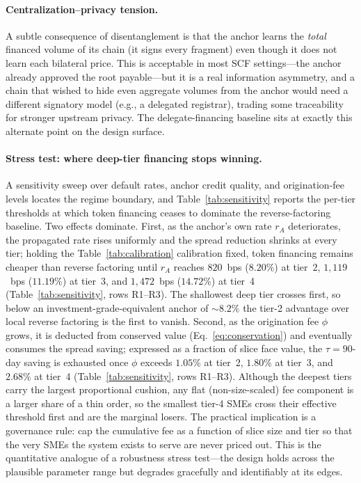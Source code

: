 \documentclass[10pt,twocolumn,letterpaper]{article}
\begin{document}
\paragraph{Centralization--privacy tension.} A subtle consequence of disentanglement
is that the anchor learns the \emph{total} financed volume of its chain (it signs every
fragment) even though it does not learn each bilateral price. This is acceptable in
most SCF settings---the anchor already approved the root payable---but it is a real
information asymmetry, and a chain that wished to hide even aggregate volumes from the
anchor would need a different signatory model (e.g., a delegated registrar), trading
some traceability for stronger upstream privacy. The delegate-financing baseline sits
at exactly this alternate point on the design surface.

\paragraph{Stress test: where deep-tier financing stops winning.} A sensitivity sweep
over default rates, anchor credit quality, and origination-fee levels locates the
regime boundary, and Table~\ref{tab:sensitivity} reports the per-tier thresholds at
which token financing ceases to dominate the reverse-factoring baseline. Two effects
dominate. First, as the anchor's own rate $r_A$ deteriorates, the propagated rate
rises uniformly and the spread reduction shrinks at every tier; holding the
Table~\ref{tab:calibration} calibration fixed, token financing remains cheaper than
reverse factoring until $r_A$ reaches $820$~bps ($8.20\%$) at tier~2,
$1{,}119$~bps ($11.19\%$) at tier~3, and $1{,}472$~bps ($14.72\%$) at tier~4
(Table~\ref{tab:sensitivity}, rows R1--R3). The shallowest deep tier crosses first, so
below an investment-grade-equivalent anchor of $\sim\!8.2\%$ the tier-2 advantage over
local reverse factoring is the first to vanish. Second, as the origination fee $\phi$
grows, it is deducted from conserved value (Eq.~\ref{eq:conservation}) and eventually
consumes the spread saving; expressed as a fraction of slice face value, the
$\tau=90$-day saving is exhausted once $\phi$ exceeds $1.05\%$ at tier~2, $1.80\%$ at
tier~3, and $2.68\%$ at tier~4 (Table~\ref{tab:sensitivity}, rows R1--R3). Although the
deepest tiers carry the largest proportional cushion, any flat (non-size-scaled) fee
component is a larger share of a thin order, so the smallest tier-4 SMEs cross their
effective threshold first and are the marginal losers. The practical implication is a
governance rule: cap the cumulative fee as a function of slice size and tier so that
the very SMEs the system exists to serve are never priced out. This is the
quantitative analogue of a robustness stress test---the design holds across the
plausible parameter range but degrades gracefully and identifiably at its edges.
\end{document}
